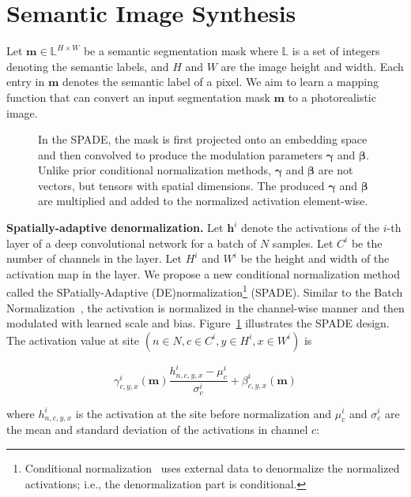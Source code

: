 \section{Semantic Image Synthesis}\label{sec::body}

Let $\mathbf{m} \in \mathbb{L}^{H\times W}$ be a semantic segmentation mask where $\mathbb{L}$ is a set of integers denoting the semantic labels, and $H$ and $W$ are the image height and width. Each entry in $\mathbf{m}$ denotes the semantic label of a pixel. We aim to learn a mapping function that can convert an input segmentation mask $\mathbf{m}$ to a photorealistic image.

\begin{figure}
 \centering

  \caption{In the SPADE, the mask is first projected onto an embedding space and then convolved to produce the modulation parameters $\bm{\gamma}$ and $\bm{\beta}$. Unlike prior conditional normalization methods, $\bm{\gamma}$ and $\bm{\beta}$ are not vectors, but tensors with spatial dimensions. The produced $\bm{\gamma}$ and $\bm{\beta}$ are multiplied and added to the normalized activation element-wise.}
 \label{fig::normalization}

\end{figure}

{\bf Spatially-adaptive denormalization.} Let $\mathbf{h}^i$ denote the activations of the $i$-th layer of a deep convolutional network for a batch of $N$ samples. Let $C^i$ be the number of channels in the layer. Let $H^i$ and $W^i$ be the height and width of the activation map in the layer. We propose a new conditional normalization method called the SPatially-Adaptive (DE)normalization\footnote{Conditional normalization~\cite{dumoulin2016learned,huang2017adain} uses external data to denormalize the normalized activations; i.e., the denormalization part is conditional.} (SPADE). Similar to the Batch Normalization~\cite{ioffe2015batch}, the activation is normalized in the channel-wise manner and then modulated with learned scale and bias. Figure~\ref{fig::normalization} illustrates the SPADE design. The activation value at site $(n\in N,c \in C^i,y \in H^i,x \in W^i)$ is

\begin{equation}
\gamma^i_{c,y,x}(\mathbf{m}) \frac{h^i_{n,c,y,x}-\mu^i_c}{\sigma^i_c} + \beta^i_{c,y,x}(\mathbf{m}) \label{eqn::spade}
\end{equation}

where $h^i_{n,c,y,x}$ is the activation at the site before normalization and $\mu^i_c$ and $\sigma^i_c$ are the mean and standard deviation of the activations in channel $c$:

